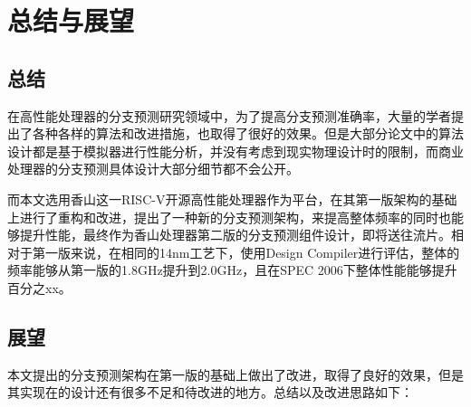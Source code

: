 
\chapter{总结与展望}

\section{总结}

在高性能处理器的分支预测研究领域中，为了提高分支预测准确率，大量的学者提出了各种各样的算法和改进措施，也取得了很好的效果。但是大部分论文中的算法设计都是基于模拟器进行性能分析，并没有考虑到现实物理设计时的限制，而商业处理器的分支预测具体设计大部分细节都不会公开。

而本文选用香山这一RISC-V开源高性能处理器作为平台，在其第一版架构的基础上进行了重构和改进，提出了一种新的分支预测架构，来提高整体频率的同时也能够提升性能，最终作为香山处理器第二版的分支预测组件设计，即将送往流片。相对于第一版来说，在相同的14nm工艺下，使用Design Compiler进行评估，整体的频率能够从第一版的1.8GHz提升到2.0GHz，且在SPEC 2006下整体性能能够提升百分之xx。

\section{展望}

本文提出的分支预测架构在第一版的基础上做出了改进，取得了良好的效果，但是其实现在的设计还有很多不足和待改进的地方。总结以及改进思路如下：


